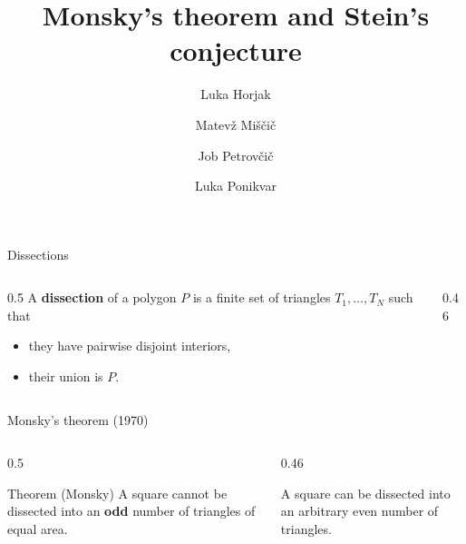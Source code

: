 \documentclass[aspectratio=169,11pt]{beamer}
\title{Monsky's theorem and Stein's conjecture}
\author{Luka Horjak \and Matevž Miščič \and Job Petrovčič \and Luka Ponikvar}
\institute{Faculty of Mathematics and Physics, University of Ljubljana, Slovenia}
\date{}
\begin{document}
\maketitle

\begin{frame}{Dissections}
\begin{columns}[c]
\begin{column}{0.5\textwidth}
A \textbf{dissection} of a polygon $P$ is a finite set of triangles $T_1,\dots,T_N$ such that
\begin{itemize}
\item they have pairwise disjoint interiors,
\item their union is $P$.
\end{itemize}
\end{column}
\begin{column}{0.46\textwidth}
\centering
{}
\end{column}
\end{columns}
\end{frame}

\begin{frame}{Monsky's theorem (1970)}
\begin{columns}[c]
\begin{column}{0.5\textwidth}
\begin{block}{Theorem (Monsky)}
A square cannot be dissected into an \textbf{odd} number of triangles of equal area.
\end{block}
\end{column}
\begin{column}{0.46\textwidth}
\centering
{}

\smallskip
{\small A square can be dissected into an arbitrary even number of triangles.}
\end{column}
\end{columns}
\end{frame}
\end{document}
